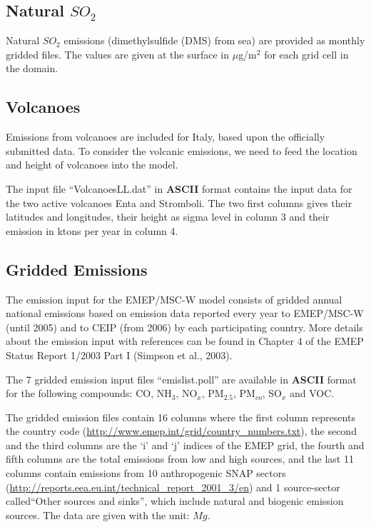 \subsection{Natural $SO_2$}
Natural $SO_2$ emissions (dimethylsulfide (DMS) from sea) are provided 
as monthly gridded files.  
The values are given at the surface in $\mu$g/m$^2$ for each grid cell in the domain. 

\subsection{Volcanoes}

Emissions from volcanoes are included for Italy, based upon the
officially submitted data.
To consider the volcanic emissions, we need to feed the location
and height of volcanoes into the model. 

The input file ``VolcanoesLL.dat'' in {\bf ASCII} format contains the input data for the two active volcanoes
 Enta and Stromboli. The two first columns gives their latitudes and longitudes, their height as sigma level
 in column 3 and their emission in ktons per year in column 4. 

\subsection{Gridded Emissions}
The emission input for the EMEP/MSC-W model consists of gridded
annual national emissions based on emission data reported every year
to EMEP/MSC-W (until 2005) 
and to CEIP (from 2006) by each
participating country. 
More details about the emission input with references can be
found in Chapter 4 of the EMEP Status Report 1/2003 Part I 
(Simpson et al., 2003).

The 7 gridded emission input files ``emislist.poll'' are available in 
{\bf ASCII} format for the following compounds: CO, NH$_{3}$,
NO$_{x}$, PM$_{2.5}$, PM$_{co}$, SO$_{x}$ and VOC.

The gridded emission files contain 16 columns where the first column 
represents the country code
(\url{http://www.emep.int/grid/country_numbers.txt}), 
the second and the third columns are the `i' and `j' indices of the
EMEP grid, the fourth and fifth columns are the total emissions from
low and high sources, and the last 11 columns contain emissions from 
10 anthropogenic SNAP sectors 
(\url{http://reports.eea.eu.int/technical_report_2001_3/en}) and 1 
source-sector called``Other sources and sinks'', which include natural and
biogenic emission sources. The data are given with the unit: $Mg$.

